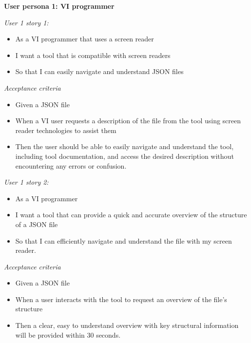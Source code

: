 \documentclass{l4proj}
\begin{document}
\begin{small}




\begin{multicols}{2}
\textbf{User persona 1: VI programmer}

\textit{User 1 story 1:}
\begin{itemize}
\item As a VI programmer that uses a screen reader
\item I want a tool that is compatible with screen readers
\item So that I can easily navigate and understand JSON files
\end{itemize}
\columnbreak

\textit{Acceptance criteria}
\begin{itemize}
\item Given a JSON file
\item When a VI user requests a description of the file from the tool using screen reader technologies to assist them
\item Then the user should be able to easily navigate and understand the tool, including tool documentation, and access the desired description without encountering any errors or confusion.
\end{itemize}

\end{multicols}

\begin{multicols}{2}

\textit{User 1 story 2:}
\begin{itemize}
\item As a VI programmer
\item I want a tool that can provide a quick and accurate overview of the structure of a JSON file
\item So that I can efficiently navigate and understand the file with my screen reader.
\end{itemize}
\columnbreak

\textit{Acceptance criteria}
\begin{itemize}
\item Given a JSON file
\item When a user interacts with the tool to request an overview of the file's structure
\item Then a clear, easy to understand overview with key structural information will be provided within 30 seconds.
\end{itemize}


\end{multicols}
\end{small}
\end{document}
